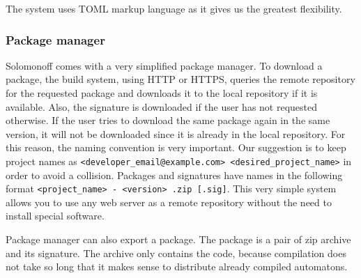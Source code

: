 The system uses TOML markup language as it gives us the greatest
flexibility.

\hypertarget{package-manager}{%
\subsubsection{Package manager}\label{package-manager}}

Solomonoff comes with a very simplified package manager. To download a
package, the build system, using HTTP or HTTPS, queries the remote
repository for the requested package and downloads it to the local
repository if it is available. Also, the signature is downloaded if the
user has not requested otherwise. If the user tries to download the same
package again in the same version, it will not be downloaded since it is
already in the local repository. For this reason, the naming convention
is very important. Our suggestion is to keep project names as
\texttt{\textless{}developer\_email@example.com\textgreater{}\ \textless{}desired\_project\_name\textgreater{}}
in order to avoid a collision. Packages and signatures have names in the
following format
\texttt{\textless{}project\_name\textgreater{}\ -\ \textless{}version\textgreater{}\ .zip\ {[}.sig{]}}.
This very simple system allows you to use any web server as a remote
repository without the need to install special software. 

Package manager can also export a package. The package is a pair of zip archive
and its signature. The archive only contains the code, because
compilation does not take so long that it makes sense to distribute
already compiled automatons.
